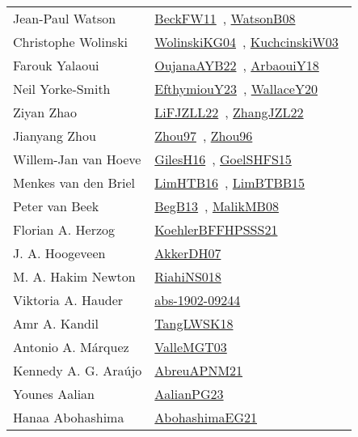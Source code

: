 {\begin{longtable}{p{4cm}p{20cm}}
Jean{-}Paul Watson & \href{works/BeckFW11.pdf}{BeckFW11}~\cite{BeckFW11}, \href{works/WatsonB08.pdf}{WatsonB08}~\cite{WatsonB08}\\
Christophe Wolinski & \href{works/WolinskiKG04.pdf}{WolinskiKG04}~\cite{WolinskiKG04}, \href{works/KuchcinskiW03.pdf}{KuchcinskiW03}~\cite{KuchcinskiW03}\\
Farouk Yalaoui & \href{works/OujanaAYB22.pdf}{OujanaAYB22}~\cite{OujanaAYB22}, \href{works/ArbaouiY18.pdf}{ArbaouiY18}~\cite{ArbaouiY18}\\
Neil Yorke{-}Smith & \href{works/EfthymiouY23.pdf}{EfthymiouY23}~\cite{EfthymiouY23}, \href{works/WallaceY20.pdf}{WallaceY20}~\cite{WallaceY20}\\
Ziyan Zhao & \href{works/LiFJZLL22.pdf}{LiFJZLL22}~\cite{LiFJZLL22}, \href{works/ZhangJZL22.pdf}{ZhangJZL22}~\cite{ZhangJZL22}\\
Jianyang Zhou & \href{works/Zhou97.pdf}{Zhou97}~\cite{Zhou97}, \href{works/Zhou96.pdf}{Zhou96}~\cite{Zhou96}\\
Willem{-}Jan van Hoeve & \href{works/GilesH16.pdf}{GilesH16}~\cite{GilesH16}, \href{works/GoelSHFS15.pdf}{GoelSHFS15}~\cite{GoelSHFS15}\\
Menkes van den Briel & \href{works/LimHTB16.pdf}{LimHTB16}~\cite{LimHTB16}, \href{works/LimBTBB15.pdf}{LimBTBB15}~\cite{LimBTBB15}\\
Peter van Beek & \href{works/BegB13.pdf}{BegB13}~\cite{BegB13}, \href{works/MalikMB08.pdf}{MalikMB08}~\cite{MalikMB08}\\
Florian A. Herzog & \href{works/KoehlerBFFHPSSS21.pdf}{KoehlerBFFHPSSS21}~\cite{KoehlerBFFHPSSS21}\\
J. A. Hoogeveen & \href{works/AkkerDH07.pdf}{AkkerDH07}~\cite{AkkerDH07}\\
M. A. Hakim Newton & \href{works/RiahiNS018.pdf}{RiahiNS018}~\cite{RiahiNS018}\\
Viktoria A. Hauder & \href{works/abs-1902-09244.pdf}{abs-1902-09244}~\cite{abs-1902-09244}\\
Amr A. Kandil & \href{works/TangLWSK18.pdf}{TangLWSK18}~\cite{TangLWSK18}\\
Antonio A. M{\'{a}}rquez & \href{works/ValleMGT03.pdf}{ValleMGT03}~\cite{ValleMGT03}\\
Kennedy A. G. Ara{\'u}jo & \href{works/AbreuAPNM21.pdf}{AbreuAPNM21}~\cite{AbreuAPNM21}\\
Younes Aalian & \href{works/AalianPG23.pdf}{AalianPG23}~\cite{AalianPG23}\\
Hanaa Abohashima & \href{works/AbohashimaEG21.pdf}{AbohashimaEG21}~\cite{AbohashimaEG21}\\

\end{longtable}}
